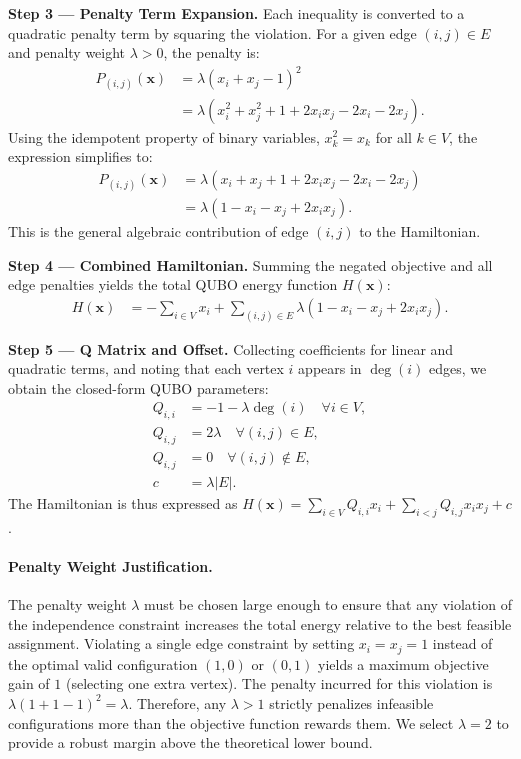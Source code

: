 \documentclass[12pt]{article}
\begin{document}
\textbf{Step 3 --- Penalty Term Expansion.} Each inequality is converted to a quadratic penalty term by squaring the violation. For a given edge $(i,j) \in E$ and penalty weight $\lambda > 0$, the penalty is:
\begin{align}
P_{(i,j)}(\mathbf{x}) &= \lambda (x_i + x_j - 1)^2 \\
&= \lambda (x_i^2 + x_j^2 + 1 + 2x_i x_j - 2x_i - 2x_j).
\end{align}
Using the idempotent property of binary variables, $x_k^2 = x_k$ for all $k \in V$, the expression simplifies to:
\begin{align}
P_{(i,j)}(\mathbf{x}) &= \lambda (x_i + x_j + 1 + 2x_i x_j - 2x_i - 2x_j) \\
&= \lambda (1 - x_i - x_j + 2x_i x_j).
\end{align}
This is the general algebraic contribution of edge $(i,j)$ to the Hamiltonian.

\textbf{Step 4 --- Combined Hamiltonian.} Summing the negated objective and all edge penalties yields the total QUBO energy function $H(\mathbf{x})$:
\begin{align}
H(\mathbf{x}) &= -\sum_{i \in V} x_i + \sum_{(i,j) \in E} \lambda (1 - x_i - x_j + 2x_i x_j).
\end{align}

\textbf{Step 5 --- Q Matrix and Offset.} Collecting coefficients for linear and quadratic terms, and noting that each vertex $i$ appears in $\deg(i)$ edges, we obtain the closed-form QUBO parameters:
\begin{align}
Q_{i,i} &= -1 - \lambda \deg(i) \quad \forall i \in V, \\
Q_{i,j} &= 2\lambda \quad \forall (i,j) \in E, \\
Q_{i,j} &= 0 \quad \forall (i,j) \notin E, \\
c &= \lambda |E|.
\end{align}
The Hamiltonian is thus expressed as $H(\mathbf{x}) = \sum_{i \in V} Q_{i,i} x_i + \sum_{i < j} Q_{i,j} x_i x_j + c$.

\paragraph{Penalty Weight Justification.}
The penalty weight $\lambda$ must be chosen large enough to ensure that any violation of the independence constraint increases the total energy relative to the best feasible assignment. Violating a single edge constraint by setting $x_i = x_j = 1$ instead of the optimal valid configuration $(1,0)$ or $(0,1)$ yields a maximum objective gain of $1$ (selecting one extra vertex). The penalty incurred for this violation is $\lambda(1+1-1)^2 = \lambda$. Therefore, any $\lambda > 1$ strictly penalizes infeasible configurations more than the objective function rewards them. We select $\lambda = 2$ to provide a robust margin above the theoretical lower bound.
\end{document}
